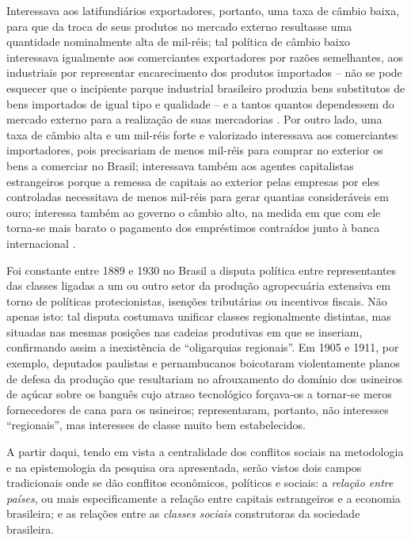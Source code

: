 Interessava aos latifundiários exportadores, portanto, uma taxa de câmbio baixa, para que da troca de seus produtos no mercado externo resultasse uma quantidade nominalmente alta de mil-réis; tal política de câmbio baixo interessava igualmente aos comerciantes exportadores por razões semelhantes, aos industriais por representar encarecimento dos produtos importados -- não se pode esquecer que o incipiente parque industrial brasileiro produzia bens substitutos de bens importados de igual tipo e qualidade -- e a tantos quantos dependessem do mercado externo para a realização de suas mercadorias \cite[p.~100]{CARONE1970inst}. Por outro lado, uma taxa de câmbio alta e um mil-réis forte e valorizado interessava aos comerciantes importadores, pois precisariam de menos mil-réis para comprar no exterior os bens a comerciar no Brasil; interessava também aos agentes capitalistas estrangeiros porque a remessa de capitais ao exterior pelas empresas por eles controladas necessitava de menos mil-réis para gerar quantias consideráveis em ouro; interessa também ao governo o câmbio alto, na medida em que com ele torna-se mais barato o pagamento dos empréstimos contraídos junto à banca internacional \cite[p.~100-101]{CARONE1970inst}.

Foi constante entre 1889 e 1930 no Brasil a disputa política entre representantes das classes ligadas a um ou outro setor da produção agropecuária extensiva em torno de políticas protecionistas, isenções tributárias ou incentivos fiscais. Não apenas isto: tal disputa costumava unificar classes regionalmente distintas, mas situadas nas mesmas posições nas cadeias produtivas em que se inseriam, confirmando assim a inexistência de ``oligarquias regionais''. Em 1905 e 1911, por exemplo, deputados paulistas e pernambucanos boicotaram violentamente planos de defesa da produção que resultariam no afrouxamento do domínio dos usineiros de açúcar sobre os banguês cujo atraso tecnológico forçava-os a tornar-se meros fornecedores de cana para os usineiros; representaram, portanto, não interesses ``regionais'', mas interesses de classe muito bem estabelecidos. 

A partir daqui, tendo em vista a centralidade dos conflitos sociais na metodologia e na epistemologia da pesquisa ora apresentada, serão vistos dois campos tradicionais onde se dão conflitos econômicos, políticos e sociais: a \textit{relação entre países}, ou mais especificamente a relação entre capitais estrangeiros e a economia brasileira; e as relações entre as \textit{classes sociais} construtoras da sociedade brasileira.

